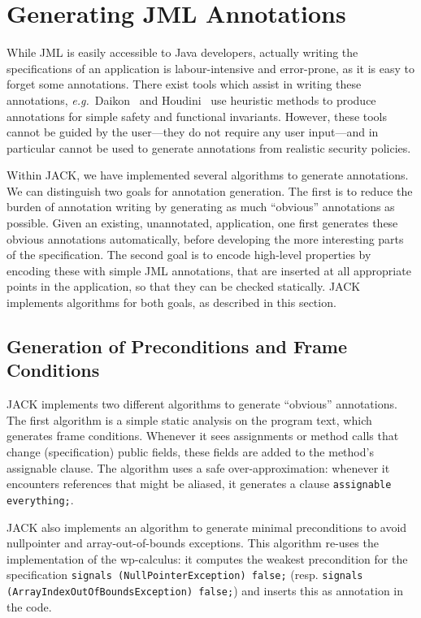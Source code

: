 \section{Generating JML Annotations}\label{SecAnnotGen}

While JML is easily accessible to Java developers, actually writing
the specifications of an application is labour-intensive and
error-prone, as it is easy to forget some annotations. There exist
tools which assist in writing these annotations,
\emph{e.g.}~Daikon~\cite{ErnstCGN01} and Houdini~\cite{FlanaganL01}
use heuristic methods to produce annotations for simple safety and
functional invariants.  However, these tools cannot be guided by the
user---they do not require any user input---and in particular cannot
be used to generate annotations from realistic security policies.

Within JACK, we have implemented several algorithms to generate
annotations. We can distinguish two goals for annotation
generation. The first is to reduce the burden of annotation writing by
generating as much ``obvious'' annotations as possible. Given an
existing, unannotated, application, one first generates these obvious
annotations automatically, before developing the more interesting
parts of the specification. The second goal is to encode high-level
properties by encoding these with simple JML annotations, that are
inserted at all appropriate points in the application, so that they
can be checked statically.  JACK implements algorithms for both goals,
as described in this section.


\subsection{Generation of Preconditions and Frame Conditions}
JACK implements two different algorithms to generate ``obvious''
annotations. The first algorithm is a simple static analysis on the
program text, which generates frame conditions. Whenever it sees
assignments or method calls that change (specification) public fields,
these fields are added to the method's assignable clause. The
algorithm uses a safe over-approximation: whenever it encounters
references that might be aliased, it generates a clause
\texttt{assignable \bsl everything;}.

JACK also implements an algorithm to generate minimal preconditions to
avoid nullpointer and array-out-of-bounds exceptions. This algorithm
re-uses the implementation of the wp-calculus: it computes the weakest
precondition for the specification
\texttt{signals (NullPointerException) false;} (resp. \texttt{signals
(ArrayIndexOutOfBoundsException) false;}) and inserts this as 
annotation in the code.

